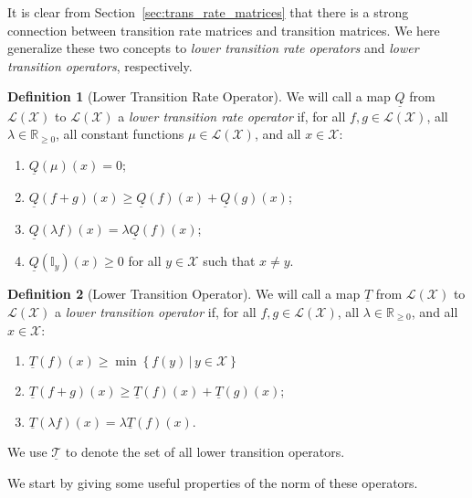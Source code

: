\documentclass[10pt]{paper}
\theoremstyle{definition}
\newtheorem{definition}{Definition}
\newcommand{\reals}{\mathbb{R}}
\newcommand{\realsnonneg}{\reals_{\geq 0}}
\newcommand{\states}{\mathcal{X}}
\newcommand{\lt}{\underline{T}}
\newcommand{\gambles}{\mathcal{L}}
\newcommand{\gamblesX}{\gambles(\states)}
\newcommand{\ind}[1]{\mathbb{I}_{#1}}
\newcommand{\lrate}{\underline{Q}}
\begin{document}
It is clear from Section~\ref{sec:trans_rate_matrices} that there is a strong connection between transition rate matrices and transition matrices. We here generalize these two concepts to \emph{lower transition rate operators} and \emph{lower transition operators}, respectively.

\begin{definition}[Lower Transition Rate Operator]\label{def:coh_low_trans_rate}
We will call a map $\lrate$ from $\gamblesX$ to $\gamblesX$ a \emph{lower transition rate operator} if, for all $f,g\in\gamblesX$, all $\lambda\in\realsnonneg$, all constant functions $\mu\in\gamblesX$, and all $x\in\states$:

\begin{enumerate}[label=LR\arabic*:,ref=LR\arabic*]
\item\label{LR:constantzero}
$\lrate(\mu)(x)=0$;
\item\label{LR:subadditive}
$\lrate(f+g)(x)\geq\lrate(f)(x)+\lrate(g)(x)$;
\item\label{LR:homo}
$\lrate(\lambda f)(x)=\lambda\lrate(f)(x)$;
\item\label{LR:nondiagpos}
$\lrate(\ind{y})(x)\geq0$ for all $y\in\states$ such that $x\neq y$.
\end{enumerate}
\vspace{5pt}
\end{definition}


\begin{definition}[Lower Transition Operator]\label{def:coh_low_trans}
We will call a map $\lt$ from $\gamblesX$ to $\gamblesX$ a \emph{lower transition operator} if, for all $f,g\in\gamblesX$, all $\lambda\in\realsnonneg$, and all $x\in\states$:

\begin{enumerate}[label=C\arabic*:]
\item
$\lt(f)(x)\geq\min\left\{f(y)\,\vert\,y\in\states\right\}$
\item
$\lt(f+g)(x)\geq\lt(f)(x)+\lt(g)(x)$;
\item
$\lt(\lambda f)(x)=\lambda\lt(f)(x)$.
\end{enumerate}
\noindent We use $\underline{\mathcal{T}}$ to denote the set of all lower transition operators.
\vspace{5pt}
\end{definition}

\noindent We start by giving some useful properties of the norm of these operators.
\end{document}
